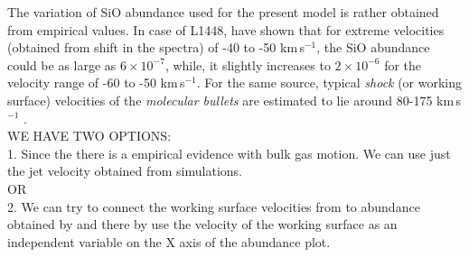 \documentclass[useAMS,usenatbib]{mn2e}
\begin{document}
The variation of SiO abundance used for the present model is rather
obtained from empirical values. In case of L1448, \cite{MartinPintado:1992p14309}
have shown that for extreme velocities (obtained from shift in the
spectra) of -40 to -50 km\,s$^{-1}$, the SiO abundance could be as
large as $6\times10^{-7}$, while, it slightly increases to
$2\times10^{-6}$ for the velocity range of -60 to -50
km\,s$^{-1}$. For the same source, typical {\em{shock}} (or working
surface) velocities of the {\em{molecular bullets}} are estimated to
lie around 80-175 km\,s$^{-1}$ \cite{Dutrey:1997p11185}.
\\
{\color{red}
WE HAVE TWO OPTIONS:\\ 
1. Since the there is a empirical evidence with bulk gas motion. We
can use just the jet velocity obtained from simulations.\\
OR\\
2. We can try to connect the working surface velocities from
\cite{Dutrey:1997p11185} to abundance obtained by
\cite{MartinPintado:1992p14309} and there by use the velocity of the
working surface as an independent variable on the X axis of the
abundance plot.
}
\end{document}

